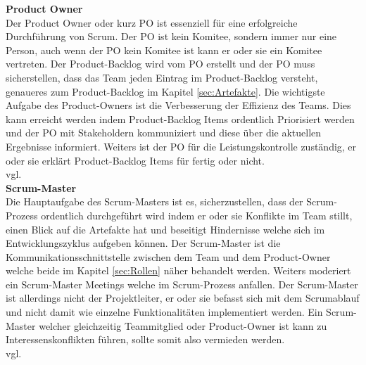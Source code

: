 			\textbf{Product Owner} \\
			Der Product Owner oder kurz PO ist essenziell für eine erfolgreiche Durchführung von Scrum. Der PO ist kein Komitee, sondern immer nur eine Person, auch wenn der PO kein Komitee ist kann er oder sie ein Komitee vertreten. Der Product-Backlog wird vom PO erstellt und der PO muss sicherstellen, dass das Team jeden Eintrag im Product-Backlog versteht, genaueres zum Product-Backlog im Kapitel \ref{sec:Artefakte}. Die wichtigste Aufgabe des Product-Owners ist die Verbesserung der Effizienz des Teams. Dies kann erreicht werden indem Product-Backlog Items ordentlich Priorisiert werden und der PO mit Stakeholdern kommuniziert und diese über die aktuellen Ergebnisse informiert. Weiters ist der PO für die Leistungskontrolle zuständig, er oder sie erklärt Product-Backlog Items für fertig oder nicht.\\vgl. \textcite{ScrumProductOwner} \\ 
			
			\textbf{Scrum-Master} \\
			Die Hauptaufgabe des Scrum-Masters ist es, sicherzustellen, dass der Scrum-Prozess ordentlich durchgeführt wird indem er oder sie Konflikte im Team stillt, einen Blick auf die Artefakte hat und beseitigt Hindernisse welche sich im Entwicklungszyklus aufgeben können. Der Scrum-Master ist die Kommunikationsschnittstelle zwischen dem Team und dem Product-Owner welche beide im Kapitel \ref{sec:Rollen} näher behandelt werden. Weiters moderiert ein Scrum-Master Meetings welche im Scrum-Prozess anfallen. Der Scrum-Master ist allerdings nicht der Projektleiter, er oder sie befasst sich mit dem Scrumablauf und nicht damit wie einzelne   Funktionalitäten implementiert werden. Ein Scrum-Master welcher gleichzeitig Teammitglied oder Product-Owner ist kann zu Interessenskonflikten führen, sollte somit also vermieden werden.\\vgl.  \textcite{ScrumScrumMaster} \\
			
